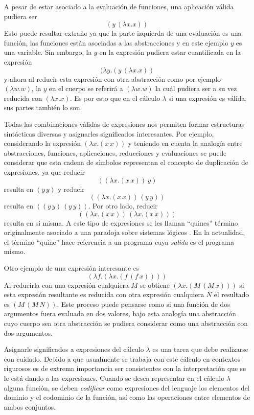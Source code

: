 A pesar de estar asociado a la evaluación de funciones, una aplicación válida pudiera ser \[ (y\, (λx.x)) \] Esto puede resultar extraño ya que la parte izquierda de una evaluación es una función, las funciones están asociadas a las abstracciones y en este ejemplo \( y \) es una variable. Sin embargo, la \( y \) en la expresión pudiera estar cuantificada en la expresión \[ (λy.(y\, (λx.x)) \] y ahora al reducir esta expresión con otra abstracción como por ejemplo \( (λw.w) \), la \( y \) en el cuerpo se referirá a \( (λw.w) \) la cuál pudiera ser a su vez reducida con \( (λx.x) \). Es por esto que en el cálculo \( λ \) si una expresión es válida, sus partes también lo son.

Todas las combinaciones válidas de expresiones nos permiten formar estructuras sintácticas diversas y asignarles significados interesantes. Por ejemplo, considerando la expresión \( (λx.(x\, x)) \) y teniendo en cuenta la analogía entre abstracciones, funciones, aplicaciones, reducciones y evaluaciones se puede considerar que esta cadena de símbolos representan el concepto de duplicación de expresiones, ya que reducir \[ ((λx.(x\, x))\, y) \] resulta en \( (y\, y) \) y reducir \[ ((λx.(x\, x))\, (y\, y)) \] resulta en \( ((y\, y)\, (y\, y)) \). Por otro lado, reducir \[ ((λx.(x\, x))\, (λx.(x\, x))) \] resulta en sí misma. A este tipo de expresiones se les llaman ``quines'' \cite[pp.~431--437]{Hofstadter:GEB} término originalmente asociado a una paradoja sobre sistemas lógicos \cite{Quine:Paradox}. En la actualidad, el término ``quine'' hace referencia a un programa cuya \emph{salida} es el programa mismo.

Otro ejemplo de una expresión interesante es\[ (λf.(λx.(f\, (f\, x)))) \]Al reducirla con una expresión cualquiera \( M \) se obtiene \( (λx.(M\, (M\, x))) \) si esta expresión resultante es reducida con otra expresión cualquiera \( N \) el resultado es \( (M\, (M\, N)) \). Este proceso puede pensarse como si una función de dos argumentos fuera evaluada en dos valores, bajo esta analogía una abstracción cuyo cuerpo sea otra abstracción se pudiera considerar como una abstracción con dos argumentos.

Asignarle significados a expresiones del cálculo \( λ \) es una tarea que debe realizarse con cuidado. Debido a que usualmente se trabaja con este cálculo en contextos rigurosos es de extrema importancia ser consistentes con la interpretación que se le está dando a las expresiones. Cuando se desea representar en el cálculo \( λ \) alguna función, se deben \emph{codificar} como expresiones del lenguaje los elementos del dominio y el codominio de la función, así como las operaciones entre elementos de ambos conjuntos.

